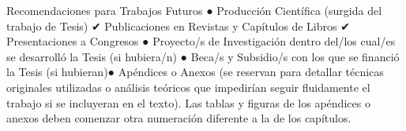Recomendaciones para Trabajos Futuros
●	Producción Científica (surgida del trabajo de Tesis)
✔	Publicaciones en Revistas y Capítulos de Libros
✔	Presentaciones a Congresos
●	Proyecto/s de Investigación dentro del/los cual/es se desarrolló la Tesis (si hubiera/n)
●	Beca/s y Subsidio/s con los que se financió la Tesis (si hubieran)●	Apéndices o Anexos (se reservan para detallar técnicas originales utilizadas o análisis teóricos que impedirían seguir fluidamente el trabajo si se incluyeran en el texto). Las tablas y figuras de los apéndices o anexos deben comenzar otra numeración diferente a la de los capítulos.